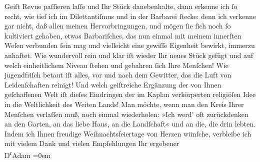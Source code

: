 \begin{ledgroupsized}[t]{13cm}
                    Geiſt Revue paſſieren laſſe und Ihr Stück danebenhalte, dann erkenne ich ſo
                    recht, wie tief ich im Dilettantiſmus und in der Barbarei ſtecke: denn ich
                    verkenne gar nicht, daß allen meinen Hervorbringungen, und mögen ſie ſich noch
                    ſo kultiviert gehaben, etwas Barbariſches, das nun einmal mit meinem innerſten
                    Weſen verbunden ſein mag und vielleicht eine gewiſſe Eigenheit bewirkt, immerzu
                    anhaftet.\pend
           \pstart
           Wie wundervoll rein und klar iſt wieder Ihr neues Stück gefügt und auf {\pb}welch einheitlichem Niveau ſtehen
                    und gebahren ſich Ihre Menſchen! Wie jugendfriſch betaut iſt alles, vor und nach
                    dem Gewitter, das die Luft von Leidenſchaften reinigt! Und welch geiſtreiche
                    Ergänzung der von Ihnen geſchaffenen Welt iſt dieſes Eindringen der im Kaplan
                    verkörperten religiöſen Idee in die Weltlichkeit des Weiten Lands! Man möchte, wenn man den Kreis Ihrer Menſchen
                    verlaſſen muß, noch einmal wiederholen: »Ich werd’ oft zurückdenken an den Garten, an das liebe
                        Haus, an die Landſchaft« und an die, die drin lebten.\pend
           \pstart
           Indem ich Ihnen freudige Weihnachtsfeiertage von Herzen wünſche, verbleibe ich
                    mit vielem Dank und vielen Empfehlungen\pend
           \pstart
           Ihr ergebener{\\[\baselineskip]}\spacefill\mbox{D\textsuperscript{r}Adam}\pend
           \leftskip=0em{}          \endnumbering{}\end{ledgroupsized}  \newcommand{\dateiname}{L02527}\newcommand{\titel}{Robert Adam an Arthur Schnitzler, 22. 12. 1929}\newcommand{\editorInnen}{Martin Anton Müller und Gerd-Hermann Susen}
      